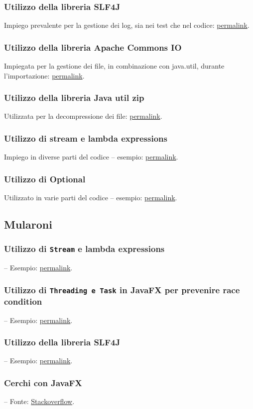 \documentclass[a4paper,12pt]{report}
\begin{document}
\subsubsection{Utilizzo della libreria SLF4J}
Impiego prevalente per la gestione dei log, sia nei test che nel codice: \href{https://google.com}{permalink}.
\subsubsection{Utilizzo della libreria Apache Commons IO}
Impiegata per la gestione dei file, in combinazione con java.util, durante l'importazione: \href{https://google.com}{permalink}.
\subsubsection{Utilizzo della libreria Java util zip}
Utilizzata per la decompressione dei file: \href{https://google.com}{permalink}. 
\subsubsection{Utilizzo di stream e lambda expressions}
Impiego in diverse parti del codice – esempio: \href{https://google.com}{permalink}.
\subsubsection{Utilizzo di Optional}
Utilizzato in varie parti del codice – esempio: \href{https://google.com}{permalink}.

\subsection{Mularoni}
\subsubsection{Utilizzo di \texttt{Stream} e lambda expressions} – Esempio: \href{https://google.com}{permalink}.
\subsubsection{Utilizzo di \texttt{Threading e Task} in JavaFX per prevenire race condition} – Esempio: \href{https://google.com}{permalink}.
\subsubsection{Utilizzo della libreria SLF4J} – Esempio: \href{https://google.com}{permalink}.
\subsubsection{Cerchi con JavaFX} – Fonte: \href{https://stackoverflow.com/questions/70876114/click-to-draw-a-shape-circle}{Stackoverflow}.
\end{document}
